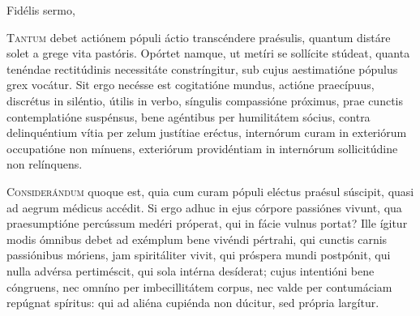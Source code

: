 \begin{caputFesti}
  \dioecBud
\end{caputFesti}

Fidélis sermo,


\begin{caputFesti}
  \dioecBud
\end{caputFesti}


\horaNocturnusII



\lettrine{T}{antum} debet actiónem pópuli áctio transcéndere praésulis,
quantum distáre solet a grege vita pastóris.
Opórtet namque, ut metíri se sollícite stúdeat,
quanta tenéndae rectitúdinis necessitáte constríngitur,
sub cujus aestimatióne pópulus grex vocátur.
Sit ergo necésse est cogitatióne mundus,
actióne praecípuus,
discrétus in siléntio,
útilis in verbo,
síngulis compassióne próximus,
prae cunctis contemplatióne suspénsus,
bene agéntibus per humilitátem sócius,
contra delinquéntium vítia per zelum justítiae eréctus,
internórum curam in exteriórum occupatióne non mínuens,
exteriórum providéntiam in internórum sollicitúdine non relínquens.



\lettrine{C}{onsiderándum} quoque est, quia cum curam pópuli eléctus
praésul súscipit, quasi ad aegrum médicus accédit.
Si ergo adhuc in ejus córpore passiónes vivunt,
qua praesumptióne percússum medéri próperat,
qui in fácie vulnus portat?
Ille ígitur modis ómnibus debet ad exémplum bene vivéndi pértrahi,
qui cunctis carnis passiónibus móriens,
jam spiritáliter vivit,
qui próspera mundi postpónit,
qui nulla advérsa pertiméscit,
qui sola intérna desíderat;
cujus intentióni bene cóngruens,
nec omníno per imbecillitátem corpus,
nec valde per contumáciam repúgnat spíritus:
qui ad aliéna cupiénda non dúcitur,
sed própria largítur.

